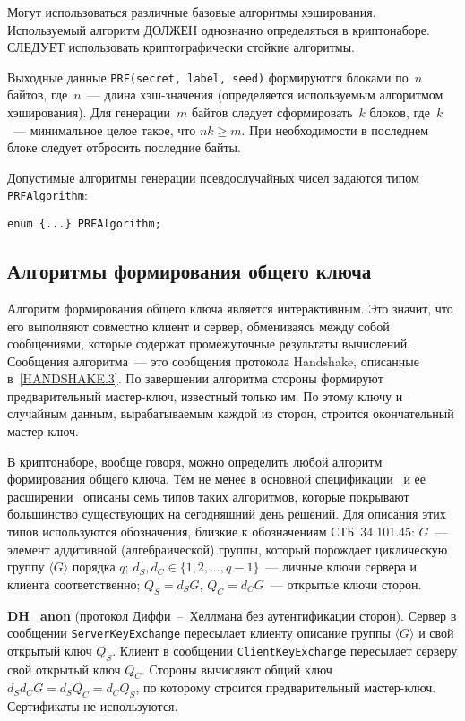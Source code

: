 Могут использоваться различные базовые алгоритмы хэширования. Используемый 
алгоритм ДОЛЖЕН однозначно определяться в криптонаборе. СЛЕДУЕТ 
использовать криптографически стойкие алгоритмы. 

Выходные данные \lstinline{PRF(secret, label, seed)} формируются блоками 
по~$n$ байтов, где~$n$~--- длина хэш-значения 
(определяется используемым алгоритмом хэширования). Для генерации~$m$ 
байтов следует сформировать~$k$ блоков, где~$k$~--- минимальное целое 
такое, что $nk\geq m$.  
При необходимости в последнем 
блоке следует отбросить последние байты. 

Допустимые алгоритмы генерации псевдослучайных чисел задаются типом 
\lstinline{PRFAlgorithm}: 
\begin{lstlisting}
enum {...} PRFAlgorithm;
\end{lstlisting}

\subsection{Алгоритмы формирования общего ключа}\label{CRYPTO.2.4}

Алгоритм формирования общего ключа является интерактивным. Это значит, что
его выполняют совместно клиент и сервер, обмениваясь между собой
сообщениями, которые содержат промежуточные результаты вычислений.
Сообщения алгоритма~--- это сообщения протокола Handshake, описанные 
в~\ref{HANDSHAKE.3}. По завершении алгоритма стороны формируют 
предварительный мастер-ключ, известный только им. По этому ключу и 
случайным данным, вырабатываемым каждой из сторон, строится окончательный 
мастер-ключ. 

В криптонаборе, вообще говоря, можно определить любой алгоритм 
формирования общего ключа. Тем не менее в основной спецификации~\cite{RFC5246} 
и ее расширении~\cite{RFC4279} описаны семь типов таких алгоритмов, 
которые покрывают большинство существующих на сегодняшний день решений. 
Для описания этих типов используются обозначения, близкие к обозначениям 
СТБ~34.101.45:  
$G$~--- элемент аддитивной (алгебраической) группы, который порождает 
циклическую группу $\langle G \rangle$ порядка $q$; 
$d_S, d_C \in \{1, 2,\ldots, q - 1\}$~--- личные ключи сервера и клиента 
соответственно;  
$Q_S = d_S G$, $Q_C = d_C G$~--- открытые ключи сторон. 

{\bf DH\_anon} (протокол Диффи~--~Хеллмана без аутентификации сторон). Сервер 
в сообщении \lstinline{ServerKeyExchange} пересылает клиенту описание группы 
$\langle G \rangle$ и свой открытый ключ $Q_S$. Клиент в сообщении 
\lstinline{ClientKeyExchange} пересылает серверу свой открытый ключ $Q_C$. 
Стороны вычисляют общий ключ $d_S d_C G = d_S Q_C = d_C Q_S$, по 
которому строится предварительный мастер-ключ. Сертификаты не 
используются. 

